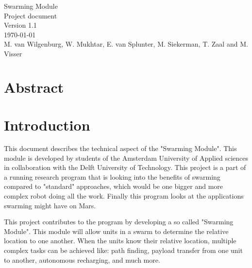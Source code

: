 \documentclass[10pt,a4paper]{article}
\begin{document}
\begin{titlepage}
    \centering
    \vfill
    {\Large

    Swarming Module\\

   
    {\small Project document}\\
    {\small Version 1.1}\\
    {\small \today}\\
        
        \vskip2cm
        {\small M. van Wilgenburg, W. Mukhtar, E. van Splunter, M. Siekerman, T. Zaal and M. Visser}\\
    }    
    \vfill
    
    \vfill
    \vfill
\end{titlepage}

\newpage

\listoffigures
\newpage

\listoftables
\newpage

\tableofcontents
\newpage

\section{Abstract}
\newpage

\section{Introduction}
This document describes the technical aspect of the "Swarming Module". This module is developed by students of the Amsterdam University of Applied sciences in collaboration with the Delft University of Technology.   This project is a part of a running research program that is looking into the benefits of swarming compared to "standard" approaches, which would be one bigger and more complex robot doing all the work. Finally this program looks at the applications swarming might have on Mars. 

This project contributes to the program by developing a so called "Swarming Module". This module will allow units in a swarm to determine the relative location to one another. When the units know their relative location, multiple complex tasks can be achieved like: path finding, payload transfer from one unit to another, autonomous recharging, and much more. 
\end{document}
